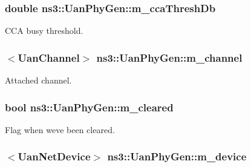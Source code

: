 \subsubsection[{\texorpdfstring{m\+\_\+cca\+Thresh\+Db}{m_ccaThreshDb}}]{\setlength{\rightskip}{0pt plus 5cm}double ns3\+::\+Uan\+Phy\+Gen\+::m\+\_\+cca\+Thresh\+Db\hspace{0.3cm}{\ttfamily [private]}}\hypertarget{classns3_1_1UanPhyGen_a72db86114a294c5c5678eabbbdc996f9}{}\label{classns3_1_1UanPhyGen_a72db86114a294c5c5678eabbbdc996f9}


C\+CA busy threshold. 

\subsubsection[{\texorpdfstring{m\+\_\+channel}{m_channel}}]{$<${\bf Uan\+Channel}$>$ ns3\+::\+Uan\+Phy\+Gen\+::m\+\_\+channel\hspace{0.3cm}{\ttfamily [private]}}\hypertarget{classns3_1_1UanPhyGen_aaea6ec335cd553c326ef729cb153ce91}{}\label{classns3_1_1UanPhyGen_aaea6ec335cd553c326ef729cb153ce91}


Attached channel. 

\subsubsection[{\texorpdfstring{m\+\_\+cleared}{m_cleared}}]{\setlength{\rightskip}{0pt plus 5cm}bool ns3\+::\+Uan\+Phy\+Gen\+::m\+\_\+cleared\hspace{0.3cm}{\ttfamily [private]}}\hypertarget{classns3_1_1UanPhyGen_a9de08dc96224def6cf358e260e10ad5a}{}\label{classns3_1_1UanPhyGen_a9de08dc96224def6cf358e260e10ad5a}


Flag when we\textquotesingle{}ve been cleared. 

\subsubsection[{\texorpdfstring{m\+\_\+device}{m_device}}]{$<${\bf Uan\+Net\+Device}$>$ ns3\+::\+Uan\+Phy\+Gen\+::m\+\_\+device\hspace{0.3cm}{\ttfamily [private]}}\hypertarget{classns3_1_1UanPhyGen_ad460ee08b16ac63f5067b8b521866cbe}{}\label{classns3_1_1UanPhyGen_ad460ee08b16ac63f5067b8b521866cbe}


